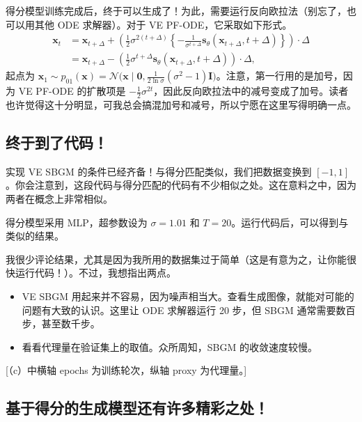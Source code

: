 得分模型训练完成后，终于可以生成了！为此，需要运行反向欧拉法（别忘了，也可以用其他 ODE 求解器）。对于 VE PF-ODE，它采取如下形式。
\begin{align}
  \mathbf x_t
    &=\mathbf x_{t+\Delta}+\left(\frac12\sigma^{2(t+\Delta)}
      \left\{-\frac{1}{\sigma^{t+\Delta}}\mathbf s_\theta(\mathbf x_{t+\Delta},t+\Delta)\right\}\right)
      \cdot\Delta
      \tag{9.36}\label{eq:09-36}\\
    &=\mathbf x_{t+\Delta}-\left(\frac12\sigma^{t+\Delta}
      \mathbf s_\theta(\mathbf x_{t+\Delta},t+\Delta)\right)\cdot\Delta,
      \tag{9.37}\label{eq:09-37}
\end{align}
起点为 $\mathbf x_1\sim p_{01}(\mathbf x)=\mathcal N\bigl(\mathbf x\mid\mathbf 0,\frac{1}{2\ln\sigma}(\sigma^2-1)\mathbf I\bigr)$。注意，第一行用的是加号，因为 VE PF-ODE 的扩散项是 $-\frac12\sigma^{2t}$，因此反向欧拉法中的减号变成了加号。读者也许觉得这十分明显，可我总会搞混加号和减号，所以宁愿在这里写得明确一点。

\subsection{终于到了代码！}

实现 VE SBGM 的条件已经齐备！与得分匹配类似，我们把数据变换到 $[-1,1]$。你会注意到，这段代码与得分匹配的代码有不少相似之处。这在意料之中，因为两者在概念上非常相似。


得分模型采用 MLP，超参数设为 $\sigma=1.01$ 和 $T=20$。运行代码后，可以得到与 类似的结果。

我很少评论结果，尤其是因为我所用的数据集过于简单（这是有意为之，让你能很快运行代码！）。不过，我想指出两点。
\begin{itemize}
  \item VE SBGM 用起来并不容易，因为噪声相当大。查看生成图像，就能对可能的问题有大致的认识。这里让 ODE 求解器运行 20 步，但 SBGM 通常需要数百步，甚至数千步。
  \item 看看代理量在验证集上的取值。众所周知，SBGM 的收敛速度较慢。
\end{itemize}

[（c）中横轴 epochs 为训练轮次，纵轴 proxy 为代理量。]

\subsection{基于得分的生成模型还有许多精彩之处！}

